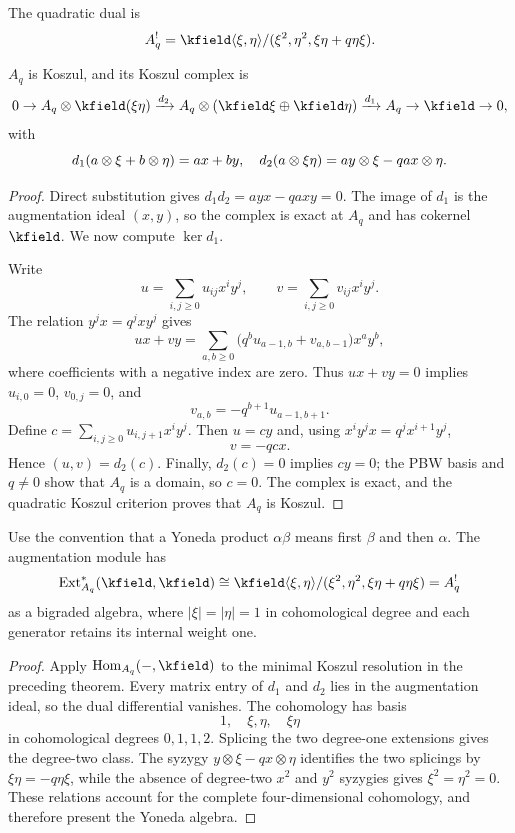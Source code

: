 The quadratic dual is
\[
 A_q^!=\kfield\angles{\xi,\eta}/(\xi^2,\eta^2,\xi\eta+q\eta\xi).
\]

\begin{theorem}[Koszulness]
$A_q$ is Koszul, and its Koszul complex is
\[
 0\to A_q\tensor\kfield(\xi\eta)
 \xrightarrow{d_2}
 A_q\tensor(\kfield\xi\oplus\kfield\eta)
 \xrightarrow{d_1}A_q\to\kfield\to0,
\]
with
\[
 d_1(a\otimes\xi+b\otimes\eta)=ax+by,
\quad
 d_2(a\otimes\xi\eta)=ay\otimes\xi-qax\otimes\eta.
\]
\end{theorem}
\begin{proof}
Direct substitution gives $d_1d_2=ayx-qaxy=0$. The image of $d_1$ is the augmentation ideal $(x,y)$, so the complex is exact at $A_q$ and has cokernel $\kfield$. We now compute $\ker d_1$.

Write
\[
 u=\sum_{i,j\ge0}u_{ij}x^iy^j,
 \qquad
 v=\sum_{i,j\ge0}v_{ij}x^iy^j.
\]
The relation $y^jx=q^jxy^j$ gives
\[
 ux+vy=\sum_{a,b\ge0}
 \bigl(q^b u_{a-1,b}+v_{a,b-1}\bigr)x^ay^b,
\]
where coefficients with a negative index are zero. Thus $ux+vy=0$ implies $u_{i,0}=0$, $v_{0,j}=0$, and
\[
 v_{a,b}=-q^{b+1}u_{a-1,b+1}.
\]
Define $c=\sum_{i,j\ge0}u_{i,j+1}x^iy^j$. Then $u=cy$ and, using $x^iy^jx=q^jx^{i+1}y^j$,
\[
 v=-qcx.
\]
Hence $(u,v)=d_2(c)$. Finally, $d_2(c)=0$ implies $cy=0$; the PBW basis and $q\ne0$ show that $A_q$ is a domain, so $c=0$. The complex is exact, and the quadratic Koszul criterion proves that $A_q$ is Koszul.
\end{proof}

\begin{theorem}
Use the convention that a Yoneda product $\alpha\beta$ means first $\beta$ and then $\alpha$. The augmentation module has
\[
 \Ext^*_{A_q}(\kfield,\kfield)
 \cong
 \kfield\angles{\xi,\eta}/(\xi^2,\eta^2,\xi\eta+q\eta\xi)
 =A_q^!
\]
as a bigraded algebra, where $|\xi|=|\eta|=1$ in cohomological degree and each generator retains its internal weight one.
\end{theorem}
\begin{proof}
Apply $\Hom_{A_q}(-,\kfield)$ to the minimal Koszul resolution in the preceding theorem. Every matrix entry of $d_1$ and $d_2$ lies in the augmentation ideal, so the dual differential vanishes. The cohomology has basis
\[
 1,\quad \xi,\eta,\quad \xi\eta
\]
in cohomological degrees $0,1,1,2$. Splicing the two degree-one extensions gives the degree-two class. The syzygy $y\otimes\xi-qx\otimes\eta$ identifies the two splicings by
$\xi\eta=-q\eta\xi$, while the absence of degree-two $x^2$ and $y^2$ syzygies gives $\xi^2=\eta^2=0$. These relations account for the complete four-dimensional cohomology, and therefore present the Yoneda algebra.
\end{proof}

